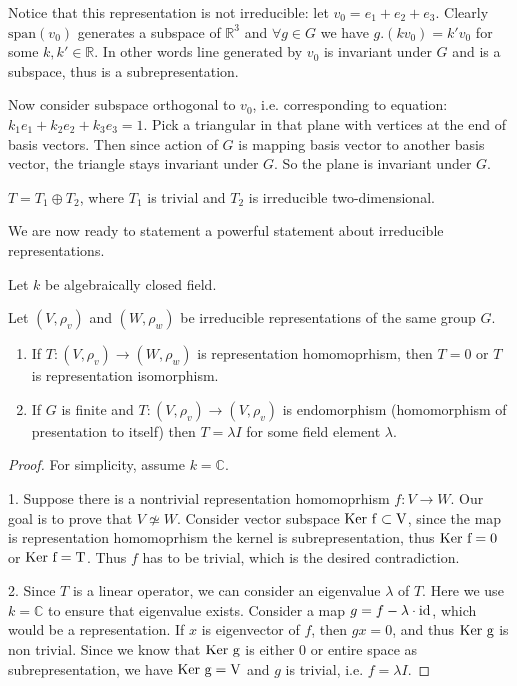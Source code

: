 \documentclass{amsart}
\def\ker{\rm Ker\ }
\def\id{\rm id}
\begin{document}
Notice that this representation is not irreducible: let $v_0 = e_1 + e_2 + e_3$.
Clearly $\text{span}(v_0)$ generates a subspace of $\mathbb{R}^3$ and $\forall g \in G$ we have $g. (k v_0) = k' v_0$ for some $k, k' \in \mathbb{R}$.
In other words line generated by $v_0$ is invariant under $G$ and is a subspace, thus is a subrepresentation.

Now consider subspace orthogonal to $v_0$, i.e. corresponding to equation:  $k_1 e_1 + k_2 e_2 + k_3 e_3 = 1$. 
Pick a triangular in that plane with vertices at the end of basis vectors.
Then since action of $G$ is mapping basis vector to another basis vector, the triangle stays invariant under $G$.
So the plane is invariant under $G$.

\begin{claim}
    $T = T_1 \oplus T_2$, where $T_1$ is trivial and $T_2$ is irreducible two-dimensional.
\end{claim}



We are now ready to statement a powerful statement about irreducible representations.

Let $k$ be algebraically closed field.
\begin{lemma}
    Let $(V, \rho_v)$ and $(W, \rho_w)$ be irreducible representations of the same group $G$.
    \begin{enumerate}
        \item If $T: (V, \rho_v) \to (W, \rho_w)$ is representation homomoprhism, then $T=0$ or $T$ is representation isomorphism.
        \item If $G$ is finite and $T : (V, \rho_v) \to (V, \rho_v) $ is endomorphism (homomorphism of presentation to itself) then $T = \lambda I$ for some field element $\lambda$.
    \end{enumerate}
\end{lemma}
\begin{proof} 
    For simplicity, assume $k=\mathbb{C}$.

    1. Suppose there is a nontrivial representation homomoprhism $f : V \to W$. Our goal is to prove that $V \not\simeq W$. Consider vector subspace $\ker f \subset V$, since the map is representation homomoprhism the kernel is subrepresentation, thus $\ker f = 0$ or $\ker f = T$. Thus $f$ has to be trivial, which is the desired contradiction. 
    
    2. Since $T$ is a linear operator, we can consider an eigenvalue $\lambda$ of $T$. 
    Here we use $k = \mathbb{C}$ to ensure that eigenvalue exists. 
    Consider a map $g = f - \lambda \cdot \id$, which would be a representation. 
    If $x$ is eigenvector of $f$, then $g x = 0$, and thus $\ker g$ is non trivial. Since we know that 
    $\ker g$ is either 0 or entire space as subrepresentation, we have $\ker g = V$ and $g$ is trivial, i.e. $f = \lambda I$.
\end{proof}
\end{document}
